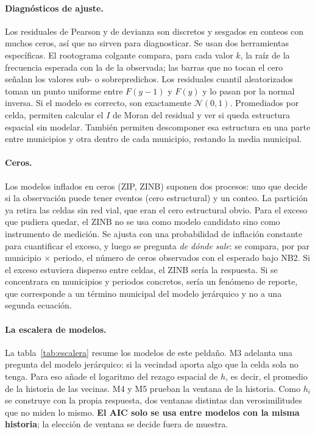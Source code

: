 \paragraph{Diagnósticos de ajuste.} Los residuales de Pearson y de devianza
son discretos y sesgados en conteos con muchos ceros, así que no sirven para
diagnosticar. Se usan dos herramientas específicas. El rootograma colgante
\parencite{kleiber2016visualizing} compara, para cada valor $k$, la raíz de la
frecuencia esperada con la de la observada; las barras que no tocan el cero
señalan los valores sub- o sobrepredichos. Los residuales cuantil
aleatorizados \parencite{dunn1996randomized} toman un punto uniforme entre
$F(y-1)$ y $F(y)$ y lo pasan por la normal inversa. Si el modelo es
correcto, son exactamente $\mathcal{N}(0,1)$. Promediados por celda,
permiten calcular el $I$ de Moran del residual y ver si queda estructura
espacial sin modelar. También permiten descomponer esa estructura en
una parte entre municipios y otra dentro de cada municipio, restando la
media municipal.

\paragraph{Ceros.} Los modelos inflados en ceros (ZIP, ZINB)
\parencite{lambert1992zero} suponen dos procesos: uno que decide si la
observación puede tener eventos (cero estructural) y un conteo. La
partición ya retira las celdas sin red vial, que eran el cero estructural
obvio. Para el exceso que pudiera quedar, el ZINB no se usa como modelo
candidato sino como instrumento de medición. Se ajusta con una probabilidad
de inflación constante para cuantificar el exceso, y luego se pregunta
\emph{de dónde sale}: se compara, por par municipio $\times$ periodo, el
número de ceros observados con el esperado bajo NB2. Si el exceso estuviera
disperso entre celdas, el ZINB sería la respuesta. Si se concentrara en
municipios y periodos concretos, sería un fenómeno de reporte, que corresponde
a un término municipal del modelo jerárquico y no a una segunda ecuación.

\paragraph{La escalera de modelos.} La tabla~\ref{tab:escalera} resume los
modelos de este peldaño. M3 adelanta una pregunta del modelo jerárquico: si
la vecindad aporta algo que la celda sola no tenga. Para eso añade el
logaritmo del rezago espacial de $h$, es decir, el promedio de la historia
de las vecinas. M4 y M5 prueban la ventana de la historia. Como $h_i$ se
construye con la propia respuesta, dos ventanas distintas dan
verosimilitudes que no miden lo mismo. \textbf{El AIC solo se usa entre
	modelos con la misma historia}; la elección de ventana se decide fuera de
muestra.

